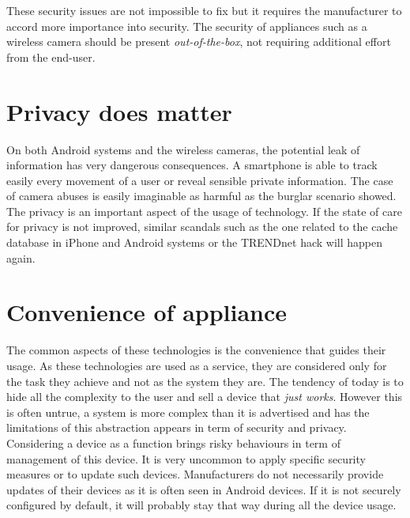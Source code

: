These security issues are not impossible to fix but it requires the manufacturer to accord more importance into security.
The security of appliances such as a wireless camera should be present \emph{out-of-the-box}, not requiring additional effort from the end-user.

\section{Privacy does matter}

On both Android systems and the wireless cameras, the potential leak of information has very dangerous consequences.
A smartphone is able to track easily every movement of a user or reveal sensible private information.
The case of camera abuses is easily imaginable as harmful as the burglar scenario showed.\\

The privacy is an important aspect of the usage of technology.
If the state of care for privacy is not improved, similar scandals such as the one related to the cache database in iPhone and Android systems or the TRENDnet hack will happen again.

\section{Convenience of appliance}

The common aspects of these technologies is the convenience that guides their usage.
As these technologies are used as a service, they are considered only for the task they achieve and not as the system they are.
The tendency of today is to hide all the complexity to the user and sell a device that \emph{just works}.
However this is often untrue, a system is more complex than it is advertised and has the limitations of this abstraction appears in term of security and privacy.\\

Considering a device as a function brings risky behaviours in term of management of this device.
It is very uncommon to apply specific security measures or to update such devices.
Manufacturers do not necessarily provide updates of their devices as it is often seen in Android devices.
If it is not securely configured by default, it will probably stay that way during all the device usage.

